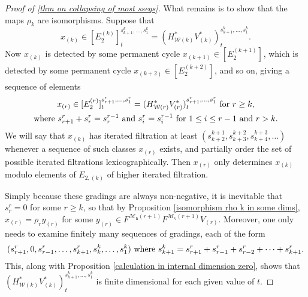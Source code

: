 \documentclass[11pt]{amsart} \renewcommand{\baselinestretch}{1.4}
\theoremstyle{plain}
\theoremstyle{definition}
\newcommand{\calw}{\mathcal{W}}
\newcommand{\calMv}{\mathcal{M}\dver}
\newcommand{\calMh}{\mathcal{M}\dhor}
\newcommand{\E}[5]{[E^{#1}_{#2}#3]^{#4}_{#5}}
\newcommand{\dver}{_\mathrm{v}}
\newcommand{\dhor}{_\mathrm{h}}
\begin{document}
\begin{Calculations of HWn for n nonzero}
\begin{proof}[Proof of \ref{thm on collapsing of most sseqs}]
What remains is to show that the maps $\rho_k$ are isomorphisms. Suppose that 
\[x_{(k)}\in \E{(k)}{2}{}{{s_{k+1}^{k},\ldots,s_1^{k}}}{t}=(H^*_{\calw(k)}V^*_{(k)})^{s_{k+1}^{k},\ldots,s_1^{k}}_t.\]
Now $x_{(k)}$ is detected by some permanent cycle $x_{(k+1)}\in \E{(k+1)}{2}{}{}{}$, which is detected by some permanent cycle $x_{(k+2)}\in \E{(k+2)}{2}{}{}{}$, and so on, giving a sequence of elements
\begin{gather*}
x_{(r)}\in \E{(r)}{2}{}{s_{r+1}^{r},\ldots,s_1^{r}}{t}=(H^*_{\calw(r)}V^*_{(r)})^{s_{r+1}^{r},\ldots,s_1^{r}}_t\textup{ for $r\geq k$,}\\
\textup{where }s^{r}_{r+1}+s^{r}_{r}=s^{r-1}_{r}\textup{ and }s^{r}_{i}=s^{r-1}_{i}\textup{  for $1\leq i\leq r-1$ and $r>k$}.
\end{gather*}
We will say that $x_{(k)}$ has iterated filtration at least $(s^{k+1}_{k+2},s^{k+2}_{k+3},s^{k+3}_{k+4},\ldots)$ whenever a sequence of such classes $x_{(r)}$ exists, and partially order the set of possible iterated filtrations lexicographically. Then $x_{(r)}$ only determines $x_{(k)}$ modulo elements of $E_{2,(k)}$ of higher iterated filtration.

Simply because these gradings are always non-negative, it is inevitable that $s_r^r=0$ for some $r\geq k$, so that by Proposition \ref{isomorphism rho k in some dims}, $x_{(r)}=\rho_ry_{(r)}$ for some $y_{(r)}\in F^{\calMh(r+1)}F^{\calMv(r+1)}V_{(r)}$. Moreover, one only needs to examine finitely many sequences of gradings, each of the form
\[(s^r_{r+1},0,s^{r}_{r-1},\ldots, s^{r}_{k+1},s^k_{k},\ldots,s^k_1)\textup{ where }s^k_{k+1}=s^r_{r+1}+s^{r}_{r-1}+s^{r}_{r-2}+\cdots +s^{r}_{k+1}.\]
This, along with Proposition \ref{calculation in internal dimension zero}, shows that $(H^*_{\calw(k)}V^*_{(k)})^{s_{k+1}^{k},\ldots,s_1^{k}}_t$ is finite dimensional for each given value of $t$.




\end{proof}
\end{Calculations of HWn for n nonzero}
\end{document}
